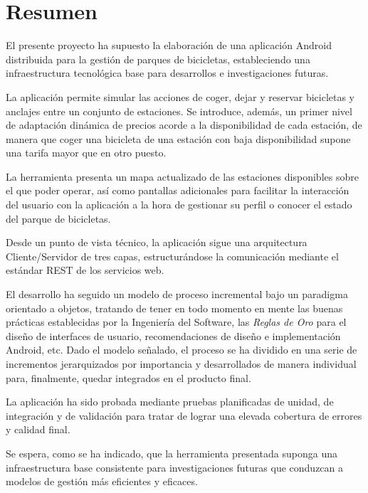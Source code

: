 
\chapter{Resumen}


El presente proyecto ha supuesto la elaboración de una aplicación Android distribuida para la gestión de parques de bicicletas, estableciendo una infraestructura tecnológica base para desarrollos e investigaciones futuras. 

La aplicación permite simular las acciones de coger, dejar y reservar bicicletas y anclajes entre un conjunto de estaciones. Se introduce, además, un primer nivel de adaptación dinámica de precios acorde a la disponibilidad de cada estación, de manera que coger una bicicleta de una estación con baja disponibilidad supone una tarifa mayor que en otro puesto.

La herramienta presenta un mapa actualizado de las estaciones disponibles sobre el que poder operar, así como pantallas adicionales para facilitar la interacción del usuario con la aplicación a la hora de gestionar su perfil o conocer el estado del parque de bicicletas.

Desde un punto de vista técnico, la aplicación sigue una arquitectura Cliente/Servidor de tres capas, estructurándose la comunicación mediante el estándar REST de los servicios web. 

El desarrollo ha seguido un modelo de proceso incremental bajo un paradigma orientado a objetos, tratando de tener en todo momento en mente las buenas prácticas establecidas por la Ingeniería del Software, las \emph{Reglas de Oro} para el diseño de interfaces de usuario, recomendaciones de diseño e implementación Android, etc. Dado el modelo señalado, el proceso se ha dividido en una serie de incrementos jerarquizados por importancia y desarrollados de manera individual para, finalmente, quedar integrados en el producto final.

La aplicación ha sido probada mediante pruebas planificadas de unidad, de integración y de validación para tratar de lograr una elevada cobertura de errores y calidad final.

Se espera, como se ha indicado, que la herramienta presentada suponga una infraestructura base consistente para investigaciones futuras que conduzcan a modelos de gestión más eficientes y eficaces.




